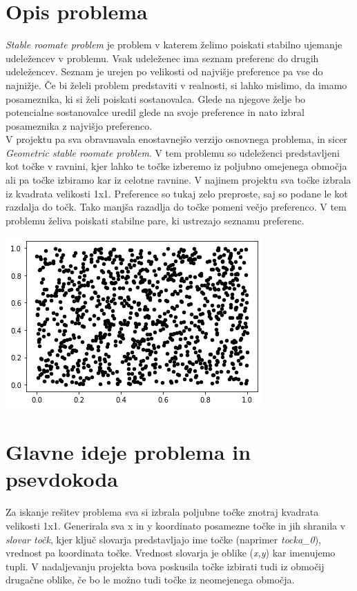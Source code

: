 \documentclass[12pt, a4paper]{article}
\begin{document}
\newpage

\section{Opis problema}
\textit{Stable roomate problem} je problem v katerem želimo poiskati stabilno ujemanje udeležencev v problemu. Vsak udeleženec ima seznam preferenc do drugih udeležencev. Seznam je urejen po velikosti od najvišje preference pa vse do najnižje. Če bi želeli problem predstaviti v realnosti, si lahko mislimo, da imamo posameznika, ki si želi poiskati sostanovalca. Glede na njegove želje bo potencialne sostanovalce uredil glede na svoje preference in nato izbral posameznika z najvišjo preferenco.\\
V projektu pa sva obravnavala enostavnejšo verzijo osnovnega problema, in sicer \textit{Geometric stable roomate problem}. V tem problemu so udeleženci predstavljeni kot točke v ravnini, kjer lahko te točke izberemo iz poljubno omejenega območja ali pa točke izbiramo kar iz celotne ravnine. V najinem projektu sva točke izbrala iz kvadrata velikosti 1x1. Preference so tukaj zelo preproste, saj so podane le kot razdalja do točk. Tako manjša razadlja do točke pomeni večjo preferenco. V tem problemu želiva poiskati stabilne pare, ki ustrezajo seznamu preferenc. \\

\begin{center}
\includegraphics{rdece_tocke.png}
\end{center}


\pagebreak
\section{Glavne ideje problema in psevdokoda}
Za iskanje rešitev problema sva si izbrala poljubne točke znotraj kvadrata velikosti 1x1. Generirala sva x in y koordinato posamezne točke in jih shranila v \textit{slovar točk}, kjer ključ slovarja predstavljajo ime točke (naprimer \textit{tocka_0}), vrednost pa koordinata točke. Vrednost slovarja je oblike (\textit{x,y}) kar imenujemo tupli. V nadaljevanju projekta bova poskusila točke izbirati tudi iz območij drugačne oblike, če bo le možno tudi točke iz neomejenega območja.\\
\end{document}
